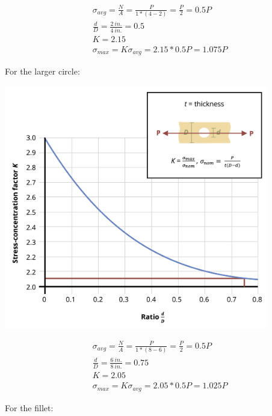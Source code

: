 \documentclass[
  letterpaper,
  DIV=11,
  numbers=noendperiod]{scrreprt}
\theoremstyle{definition}
\theoremstyle{remark}
\begin{document}
\begin{tcolorbox}
\begin{tcolorbox}
\[
\begin{aligned}
& \sigma_{avg}=\frac{N}{A}=\frac{P}{1 *(4-2)}=\frac{P}{2}=0.5 P \\
& \frac{d}{D}=\frac{2{~in.}}{4{~in.}}=0.5 \\
& K=2.15 \\
& \sigma_{max }=K \sigma_{avg}=2.15 * 0.5 P=1.075 P
\end{aligned}
\]

For the larger circle:

\begin{center}
\includegraphics[width=4.54167in,height=\textheight]{images/PNGs/Example 5.2 part 3.png}
\end{center}

\[
\begin{aligned}
& \sigma_{avg}=\frac{N}{A}=\frac{P}{1 *(8-6)}=\frac{P}{2}=0.5 P \\
& \frac{d}{D}=\frac{6{~in.}}{8{~in.}}=0.75 \\
& K=2.05 \\
& \sigma_{max}=K \sigma_{avg}=2.05 * 0.5 P=1.025 P
\end{aligned}
\]

For the fillet:


\end{tcolorbox}
\end{tcolorbox}
\end{document}
